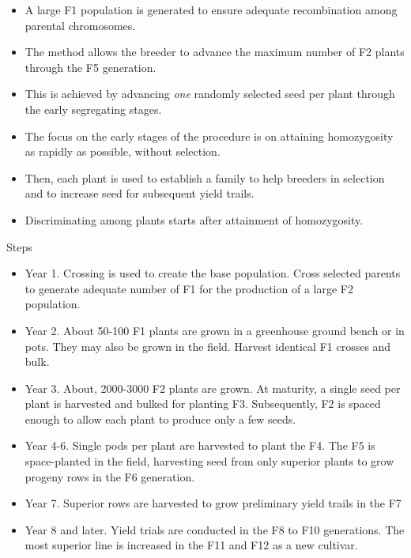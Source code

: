 \documentclass[11pt,ignorenonframetext,aspectratio=169]{beamer}
\providecommand{\tightlist}{%
  \setlength{\itemsep}{0pt}\setlength{\parskip}{0pt}}
\begin{document}
\begin{frame}{}
\protect\hypertarget{section-15}{}
\begin{itemize}
\tightlist
\item
  A large F1 population is generated to ensure adequate recombination
  among parental chromosomes.
\item
  The method allows the breeder to advance the maximum number of F2
  plants through the F5 generation.
\item
  This is achieved by advancing \emph{one} randomly selected seed per
  plant through the early segregating stages.
\item
  The focus on the early stages of the procedure is on attaining
  homozygosity as rapidly as possible, without selection.
\item
  Then, each plant is used to establish a family to help breeders in
  selection and to increase seed for subsequent yield trails.
\item
  Discriminating among plants starts after attainment of homozygosity.
\end{itemize}
\end{frame}

\begin{frame}{Steps}
\protect\hypertarget{steps}{}
\begin{itemize}
\tightlist
\item
  Year 1. Crossing is used to create the base population. Cross selected
  parents to generate adequate number of F1 for the production of a
  large F2 population.
\item
  Year 2. About 50-100 F1 plants are grown in a greenhouse ground bench
  or in pots. They may also be grown in the field. Harvest identical F1
  crosses and bulk.
\item
  Year 3. About, 2000-3000 F2 plants are grown. At maturity, a single
  seed per plant is harvested and bulked for planting F3. Subsequently,
  F2 is spaced enough to allow each plant to produce only a few seeds.
\item
  Year 4-6. Single pods per plant are harvested to plant the F4. The F5
  is space-planted in the field, harvesting seed from only superior
  plants to grow progeny rows in the F6 generation.
\item
  Year 7. Superior rows are harvested to grow preliminary yield trails
  in the F7
\item
  Year 8 and later. Yield trials are conducted in the F8 to F10
  generations. The most superior line is increased in the F11 and F12 as
  a new cultivar.
\end{itemize}
\end{frame}
\end{document}
